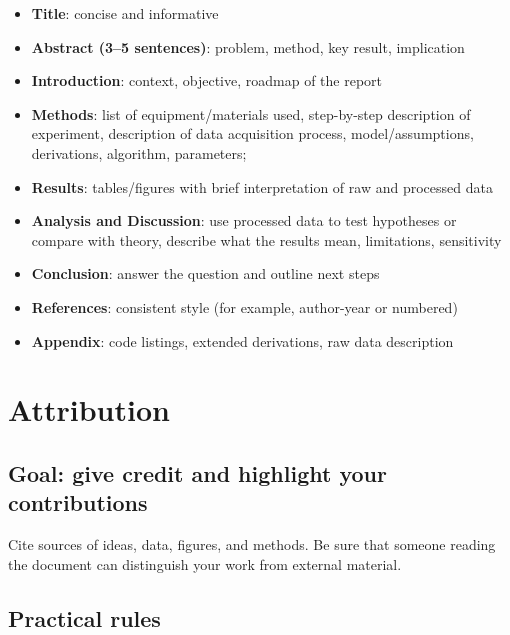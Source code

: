 \documentclass[
  a4paper,
  DIV=11,
  numbers=noendperiod,
  oneside]{scrreprt}
\providecommand{\tightlist}{%
  \setlength{\itemsep}{0pt}\setlength{\parskip}{0pt}}
\begin{document}
\begin{itemize}
\tightlist
\item
  \textbf{Title}: concise and informative
\item
  \textbf{Abstract (3--5 sentences)}: problem, method, key result,
  implication
\item
  \textbf{Introduction}: context, objective, roadmap of the report
\item
  \textbf{Methods}: list of equipment/materials used, step-by-step
  description of experiment, description of data acquisition process,
  model/assumptions, derivations, algorithm, parameters;
\item
  \textbf{Results}: tables/figures with brief interpretation of raw and
  processed data
\item
  \textbf{Analysis and Discussion}: use processed data to test
  hypotheses or compare with theory, describe what the results mean,
  limitations, sensitivity
\item
  \textbf{Conclusion}: answer the question and outline next steps
\item
  \textbf{References}: consistent style (for example, author-year or
  numbered)
\item
  \textbf{Appendix}: code listings, extended derivations, raw data
  description
\end{itemize}

\section{Attribution}\label{sec-writing-attribution}

\subsection{Goal: give credit and highlight your
contributions}\label{goal-give-credit-and-highlight-your-contributions}

Cite sources of ideas, data, figures, and methods. Be sure that someone
reading the document can distinguish your work from external material.

\subsection{Practical rules}\label{practical-rules}
\end{document}
